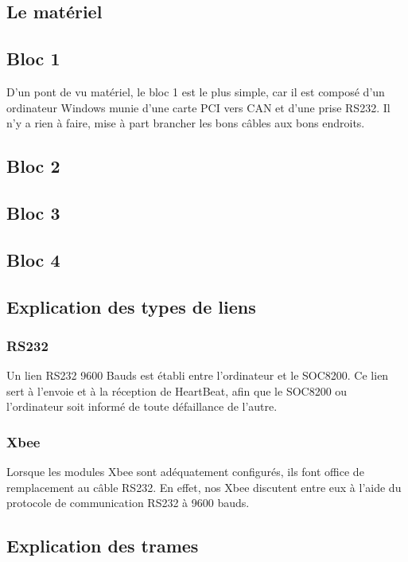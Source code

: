 \documentclass[10pt,a4paper,final]{article}
\begin{document}
\begin{spacing}{1.5}


\pagebreak

\section{Le matériel}
\subsection{Bloc 1}
D'un pont de vu matériel, le bloc 1 est le plus simple, car il est composé d'un ordinateur Windows munie d'une carte PCI vers CAN et d'une prise RS232. Il n'y a rien à faire, mise à part brancher les bons câbles aux bons endroits.

\subsection{Bloc 2}

\subsection{Bloc 3}

\subsection{Bloc 4}



\subsection{Explication des types de liens}
\subsubsection{RS232}
Un lien RS232 9600 Bauds est établi entre l'ordinateur et le SOC8200. Ce lien sert à l'envoie et à la réception de HeartBeat, afin que le SOC8200 ou l'ordinateur soit informé de toute défaillance de l'autre.

\subsubsection{Xbee}
Lorsque les modules Xbee sont adéquatement configurés, ils font office de remplacement au câble RS232. En effet, nos Xbee discutent entre eux à l'aide du protocole de communication RS232 à 9600 bauds.  


\subsection{Explication des trames}

\end{spacing}
\end{document}
